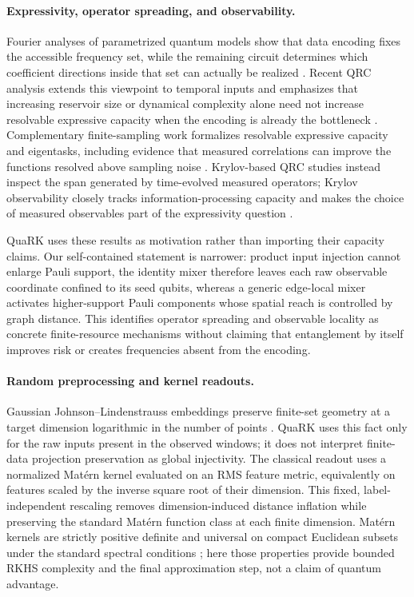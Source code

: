 \paragraph{Expressivity, operator spreading, and observability.}
Fourier analyses of parametrized quantum models show that data encoding fixes
the accessible frequency set, while the remaining circuit determines which
coefficient directions inside that set can actually be realized
\citep{SchuldSwekeMeyer2021}.  Recent QRC analysis extends this viewpoint to
temporal inputs and emphasizes that increasing reservoir size or dynamical
complexity alone need not increase resolvable expressive capacity when the
encoding is already the bottleneck \citep{SchuetteEtAl2026}.  Complementary
finite-sampling work formalizes resolvable expressive capacity and eigentasks,
including evidence that measured correlations can improve the functions
resolved above sampling noise \citep{HuEtAl2023Eigentasks}.  Krylov-based QRC
studies instead inspect the span generated by time-evolved measured operators;
Krylov observability closely tracks information-processing capacity and makes
the choice of measured observables part of the expressivity question
\citep{CindrakLudgeJaurigue2025,CindrakJaurigueLudge2025}.

QuaRK uses these results as motivation rather than importing their capacity
claims.  Our self-contained statement is narrower: product input injection
cannot enlarge Pauli support, the identity mixer therefore leaves each raw
observable coordinate confined to its seed qubits, whereas a generic
edge-local mixer activates higher-support Pauli components whose spatial reach
is controlled by graph distance.  This identifies operator spreading and
observable locality as concrete finite-resource mechanisms without claiming
that entanglement by itself improves risk or creates frequencies absent from
the encoding.

\paragraph{Random preprocessing and kernel readouts.}
Gaussian Johnson--Lindenstrauss embeddings preserve finite-set geometry at a
target dimension logarithmic in the number of points
\citep{DasguptaGupta2003,Woodruff2014}.  QuaRK uses this fact only for the raw
inputs present in the observed windows; it does not interpret finite-data
projection preservation as global injectivity.  The classical readout uses a
normalized Mat\'ern kernel evaluated on an RMS feature metric, equivalently on
features scaled by the inverse square root of their dimension.  This fixed,
label-independent rescaling removes dimension-induced distance inflation while
preserving the standard Mat\'ern function class at each finite dimension.
Mat\'ern kernels are strictly positive definite
and universal on compact Euclidean subsets under the standard spectral
conditions \citep{Genton2001,SriperumbudurEtAl2011,PorcuEtAl2024}; here those
properties provide bounded RKHS complexity and the final approximation step,
not a claim of quantum advantage.

